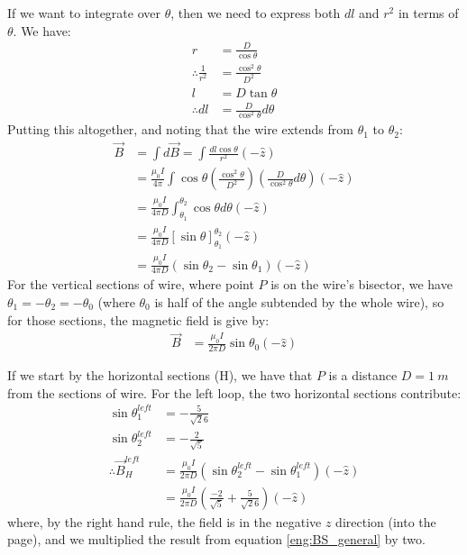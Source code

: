 \begin{solution}
If we want to integrate over $\theta$, then we need to express both $d l$ and $r^2$ in terms of $\theta$. We have:
\begin{align*}
r&=\frac{D}{\cos\theta}\\
\therefore \frac{1}{r^2}&=\frac{\cos^2\theta}{D^2}\\
l&=D\tan\theta\\
\therefore dl&=\frac{D}{\cos^2\theta}d\theta
\end{align*}
Putting this altogether, and noting that the wire extends from $\theta_1$ to $\theta_2$:
\begin{align}
\label{eng:BS_general}
\vec B&=\int d\vec B=\int \frac{dl\cos\theta}{r^2}(-\hat z)\nonumber\\
&=\frac{\mu_0I}{4\pi} \int\cos\theta\left( \frac{\cos^2\theta}{D^2}\right) \left( \frac{D}{\cos^2\theta}d\theta\right)(-\hat z)\nonumber\\
&=\frac{\mu_0I}{4\pi D}\int_{\theta_1}^{\theta_2}\cos\theta d\theta(-\hat z)\nonumber\\
&=\frac{\mu_0I}{4\pi D}[\sin\theta]_{\theta_1}^{\theta_2}(-\hat z)\nonumber\\
&=\frac{\mu_0I}{4\pi D}(\sin\theta_2-\sin\theta_1)(-\hat z)
\end{align}
For the vertical sections of wire, where point $P$ is on the wire's bisector, we have $\theta_1=-\theta_2=-\theta_0$ (where $\theta_0$ is half of the angle subtended by the whole wire), so for those sections, the magnetic field is give by:
\begin{align*}
\vec B&=\frac{\mu_0I}{2\pi D}\sin\theta_0(-\hat z)
\end{align*}

If we start by the horizontal sections (H), we have that $P$ is a distance $D=\SI{1}{m}$ from the sections of wire. For the left loop, the two horizontal sections contribute:
\begin{align*}
\sin\theta_1^{left}&=-\frac{5}{\sqrt 26}\\
\sin\theta_2^{left}&=-\frac{2}{\sqrt 5}\\
\therefore\vec B_H^{left}&=\frac{\mu_0I}{2\pi D}(\sin\theta_2^{left}-\sin\theta_1^{left})(-\hat z)\\
&=\frac{\mu_0I}{2\pi D}\left(\frac{-2}{\sqrt 5}+\frac{5}{\sqrt 26}\right)(-\hat z)
\end{align*}
where, by the right hand rule, the field is in the negative $z$ direction (into the page), and we multiplied the result from equation \ref{eng:BS_general} by two.


\end{solution}
